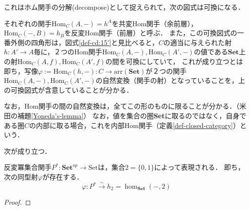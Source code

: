\documentclass[uplatex, dvipdfmx]{jsreport}
\begin{document}
これはホム関手の分解(decompose)として捉えられて，次の図式は可換になる．
\begin{center}\end{center}
それぞれの関手$\mathrm{Hom}_C(A,-)=h^A$を共変Hom関手（余前層），$\mathrm{Hom}_C(-,B)=h_B$を反変Hom関手（前層）と呼ぶ．
また，この可換図式の一番外側の四角形は，図式\ref{def-cd:15'}と見比べると，$C$の適当に与えられた射$h:A'\to A$毎に，２つのHom関手$\mathrm{Hom}_C(A,-),\mathrm{Hom}_C(A',-)$の値である$\mathbf{Set}$上の射$\mathrm{Hom}_C(A,f),\mathrm{Hom}_C(A',f)$の間を可換にしていて，
これが成り立つとは即ち，写像$\varphi := \mathrm{Hom}_C(h,-):C\to \mathrm{arr}(\mathbf{Set})$が２つの関手$\mathrm{Hom}_C(A,-),\mathrm{Hom}_C(A',-)$の自然変換（関手の射）となっていることを，上の可換図式が含意していることが分かる．

なお，Hom関手の間の自然変換は，全てこの形のものに限ることが分かる．（米田の補題\ref{Yoneda's-lemma}）
なお，値を集合の圏\textbf{Set}に取るのではなく，自身である圏$C$の内部に取る場合，これを内部Hom関手（定義\ref{def-closed-category}）という．

\begin{example}[反変冪集合関手は表現可能関手である]
    次が成り立つ．
    \begin{proposition}[$P^*$ is represented by 2]
        反変冪集合関手$P^*:\mathbf{Set}^{op}\to\mathrm{Set}$は，集合$2=\{ 0, 1\}$によって表現される．
        即ち，次の同型射$\varphi$が存在する．
        $$\varphi : P^*\xrightarrow{\sim} h_2=\hom_{\mathbf{Set}}(-,2)$$
    \end{proposition}
    \begin{proof}
        
    \end{proof}
\end{example}
\end{document}
